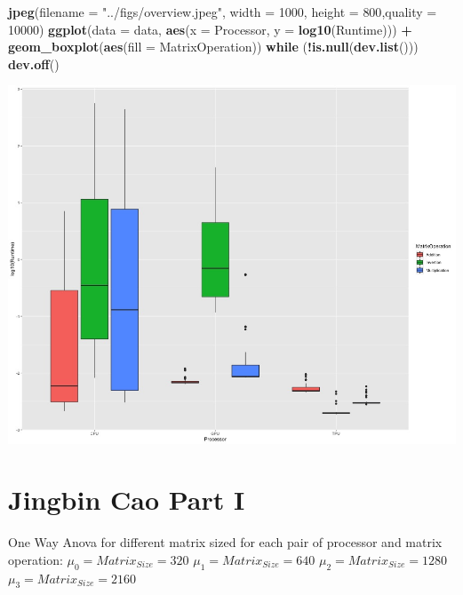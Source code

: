 \documentclass[
]{article}
\newenvironment{Shaded}{\begin{snugshade}}{\end{snugshade}}
\newcommand{\ControlFlowTok}[1]{\textcolor[rgb]{0.13,0.29,0.53}{\textbf{#1}}}
\newcommand{\DataTypeTok}[1]{\textcolor[rgb]{0.13,0.29,0.53}{#1}}
\newcommand{\DecValTok}[1]{\textcolor[rgb]{0.00,0.00,0.81}{#1}}
\newcommand{\KeywordTok}[1]{\textcolor[rgb]{0.13,0.29,0.53}{\textbf{#1}}}
\newcommand{\NormalTok}[1]{#1}
\newcommand{\OperatorTok}[1]{\textcolor[rgb]{0.81,0.36,0.00}{\textbf{#1}}}
\newcommand{\StringTok}[1]{\textcolor[rgb]{0.31,0.60,0.02}{#1}}
\begin{document}
\begin{Shaded}
\begin{Highlighting}[]
\KeywordTok{jpeg}\NormalTok{(}\DataTypeTok{filename =} \StringTok{"../figs/overview.jpeg"}\NormalTok{, }\DataTypeTok{width =} \DecValTok{1000}\NormalTok{, }\DataTypeTok{height =} \DecValTok{800}\NormalTok{,}\DataTypeTok{quality =} \DecValTok{10000}\NormalTok{)}
\KeywordTok{ggplot}\NormalTok{(}\DataTypeTok{data =}\NormalTok{ data, }\KeywordTok{aes}\NormalTok{(}\DataTypeTok{x =}\NormalTok{ Processor, }\DataTypeTok{y =} \KeywordTok{log10}\NormalTok{(Runtime))) }\OperatorTok{+}
\KeywordTok{geom\_boxplot}\NormalTok{(}\KeywordTok{aes}\NormalTok{(}\DataTypeTok{fill =}\NormalTok{ MatrixOperation))}
\ControlFlowTok{while}\NormalTok{ (}\OperatorTok{!}\KeywordTok{is.null}\NormalTok{(}\KeywordTok{dev.list}\NormalTok{()))  }\KeywordTok{dev.off}\NormalTok{()}
\end{Highlighting}
\end{Shaded}

\begin{center}\includegraphics[width=0.9\linewidth]{../figs/overview} \end{center}

\hypertarget{jingbin-cao-part-i}{%
\section{Jingbin Cao Part I}\label{jingbin-cao-part-i}}

One Way Anova for different matrix sized for each pair of processor and
matrix operation: \(\mu_0 = Matrix_{Size}=320\)
\(\mu_1 = Matrix_{Size}=640\) \(\mu_2 = Matrix_{Size}=1280\)
\(\mu_3 = Matrix_{Size}=2160\)
\end{document}
